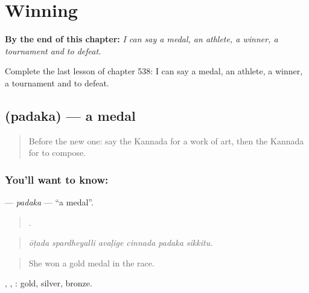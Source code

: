 
\chapter{Winning}
\label{ch:ka-winning}

\begin{chapteropening}
\textbf{By the end of this chapter:} \emph{I can say a medal, an athlete, a winner, a tournament and to defeat.}

Complete the last lesson of chapter 538: I can say a medal, an athlete, a winner, a tournament and to defeat.
\end{chapteropening}

\section[\texorpdfstring{\kn{ಪದಕ} (padaka)}{ಪದಕ (padaka)}]{ (padaka) — a medal}

\label{lesson:KA-C538-padaka}



\begin{quote}
Before the new one: say the Kannada for a work of art, then the Kannada for to compose.
\end{quote}

\subsection*{You'll want to know: }
\textbf{} — \emph{padaka} — \textquotedblleft{}a medal\textquotedblright{}.

\begin{quote}
     .
\end{quote}

\begin{quote}
\emph{ōṭada spardheyalli avaḷige cinnada padaka sikkitu.}
\end{quote}

\begin{quote}
She won a gold medal in the race.
\end{quote}

, , : gold, silver, bronze.

